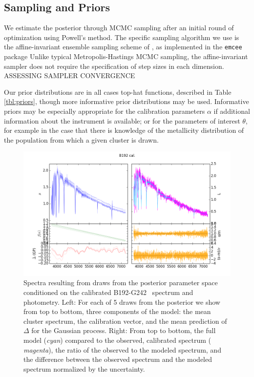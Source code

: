 \documentclass[iop,numberedappendix]{emulateapj}
\newcommand{\excluster}{B192-G242}
\begin{document}
\subsection{Sampling and Priors}

We estimate the posterior through MCMC sampling after an initial round
of optimization using Powell's method.  The specific sampling
algorithm we use is the affine-invariant ensemble sampling scheme of
\citet{goodman}, as implemented in the \texttt{emcee} package \citep{emcee}
Unlike typical Metropolis-Hastings MCMC sampling, the affine-invariant
sampler does not require the specification of step sizes in each
dimension.  {\color{blue}ASSESSING SAMPLER CONVERGENCE}
 
Our prior distributions are in all cases top-hat functions, described
in Table \ref{tbl:priors}, though more informative prior distributions
may be used.  Informative priors may be especially appropriate for the
calibration parameters $\alpha$ if additional information about the
instrument is available; or for the parameters of interest $\theta$,
for example in the case that there is knowledge of the metallicity
distribution of the population from which a given cluster is drawn.



\begin{figure}[h!]
\includegraphics[width=\textwidth]{figures/sfig_b192-g242_020_cal.png}
\caption{Spectra resulting from draws from the posterior parameter
space conditioned on the calibrated \excluster~ spectrum and
photometry.  Left: For each of 5 draws from the posterior we show from
top to bottom, three components of the model: the mean cluster
spectrum, the calibration vector, and the mean prediction of $\Delta$
for the Gaussian process.  Right: From top to bottom, the full model
({\it cyan}) compared to the observed, calibrated spectrum ({\it
magenta}), the ratio of the observed to the modeled spectrum, and the
difference between the observed spectrum and the modeled spectrum
normalized by the uncertainty.
\label{fig:inferred_spectrum}}
\end{figure}
\end{document}
